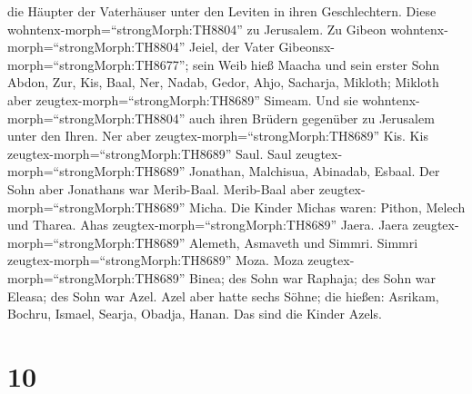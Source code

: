 die Häupter der Vaterhäuser unter den Leviten in ihren Geschlechtern.
Diese wohntenx-morph=``strongMorph:TH8804'' zu Jerusalem. 
Zu Gibeon wohntenx-morph=``strongMorph:TH8804'' Jeiel, der Vater
Gibeonsx-morph=``strongMorph:TH8677''; sein Weib hieß Maacha
 und sein erster Sohn Abdon, Zur, Kis, Baal, Ner, Nadab,
 Gedor, Ahjo, Sacharja, Mikloth;  Mikloth aber
zeugtex-morph=``strongMorph:TH8689'' Simeam. Und sie
wohntenx-morph=``strongMorph:TH8804'' auch ihren Brüdern gegenüber zu
Jerusalem unter den Ihren.  Ner aber
zeugtex-morph=``strongMorph:TH8689'' Kis. Kis
zeugtex-morph=``strongMorph:TH8689'' Saul. Saul
zeugtex-morph=``strongMorph:TH8689'' Jonathan, Malchisua, Abinadab,
Esbaal.  Der Sohn aber Jonathans war Merib-Baal. Merib-Baal
aber zeugtex-morph=``strongMorph:TH8689'' Micha.  Die
Kinder Michas waren: Pithon, Melech und Tharea.  Ahas
zeugtex-morph=``strongMorph:TH8689'' Jaera. Jaera
zeugtex-morph=``strongMorph:TH8689'' Alemeth, Asmaveth und Simmri.
Simmri zeugtex-morph=``strongMorph:TH8689'' Moza.  Moza
zeugtex-morph=``strongMorph:TH8689'' Binea; des Sohn war Raphaja; des
Sohn war Eleasa; des Sohn war Azel.  Azel aber hatte sechs
Söhne; die hießen: Asrikam, Bochru, Ismael, Searja, Obadja, Hanan. Das
sind die Kinder Azels.

\hypertarget{section-9}{%
\section{10}\label{section-9}}

